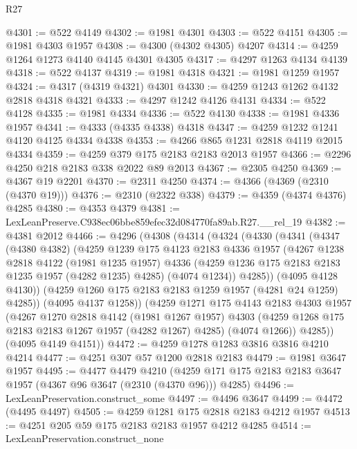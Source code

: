 \begin{lexlean}{R27}
\begin{coremodule}
@4301 := @522 @4149
@4302 := @1981 @4301
@4303 := @522 @4151
@4305 := @1981 @4303 @1957
@4308 := @4300 (@4302 @4305) @4207
@4314 := @4259 @1264 @1273 @4140 @4145 @4301 @4305
@4317 := @4297 @1263 @4134 @4139
@4318 := @522 @4137
@4319 := @1981 @4318
@4321 := @1981 @1259 @1957
@4324 := @4317 (@4319 @4321) @4301
@4330 := @4259 @1243 @1262 @4132 @2818 @4318 @4321
@4333 := @4297 @1242 @4126 @4131
@4334 := @522 @4128
@4335 := @1981 @4334
@4336 := @522 @4130
@4338 := @1981 @4336 @1957
@4341 := @4333 (@4335 @4338) @4318
@4347 := @4259 @1232 @1241 @4120 @4125 @4334 @4338
@4353 := @4266 @865 @1231 @2818 @4119 @2015 @4334
@4359 := @4259 @379 @175 @2183 @2183 @2013 @1957
@4366 := @2296 @4250 @218 @2183 @338 @2022 @89 @2013
@4367 := @2305 @4250
@4369 := @4367 @19 @2201
@4370 := @2311 @4250
@4374 := @4366 (@4369 (@2310 (@4370 @19)))
@4376 := @2310 (@2322 @338)
@4379 := @4359 (@4374 @4376) @4285
@4380 := @4353 @4379
@4381 := LexLeanPreserve.C938ec06bbe859efec32d084770fa89ab.R27.__rel_19
@4382 := @4381 @2012
@4466 := @4296
    (@4308
      (@4314
        (@4324
          (@4330
            (@4341
              (@4347
                (@4380 @4382)
                (@4259
                  @1239
                  @175
                  @4123
                  @2183
                  @4336
                  @1957
                  (@4267
                    @1238
                    @2818
                    @4122
                    (@1981 @1235 @1957)
                    @4336
                    (@4259 @1236 @175 @2183 @2183 @1235 @1957 (@4282 @1235) @4285)
                    (@4074 @1234))
                  @4285))
              (@4095 @4128 @4130))
            (@4259 @1260 @175 @2183 @2183 @1259 @1957 (@4281 @24 @1259) @4285))
          (@4095 @4137 @1258))
        (@4259
          @1271
          @175
          @4143
          @2183
          @4303
          @1957
          (@4267
            @1270
            @2818
            @4142
            (@1981 @1267 @1957)
            @4303
            (@4259 @1268 @175 @2183 @2183 @1267 @1957 (@4282 @1267) @4285)
            (@4074 @1266))
          @4285))
      (@4095 @4149 @4151))
@4472 := @4259 @1278 @1283 @3816 @3816 @4210 @4214
@4477 := @4251 @307 @57 @1200 @2818 @2183
@4479 := @1981 @3647 @1957
@4495 := @4477
    @4479
    @4210
    (@4259 @171 @175 @2183 @2183 @3647 @1957 (@4367 @96 @3647 (@2310 (@4370 @96))) @4285)
@4496 := LexLeanPreservation.construct_some
@4497 := @4496 @3647
@4499 := @4472 (@4495 @4497)
@4505 := @4259 @1281 @175 @2818 @2183 @4212 @1957
@4513 := @4251 @205 @59 @175 @2183 @2183 @1957 @4212 @4285
@4514 := LexLeanPreservation.construct_none

\end{coremodule}
\end{lexlean}
